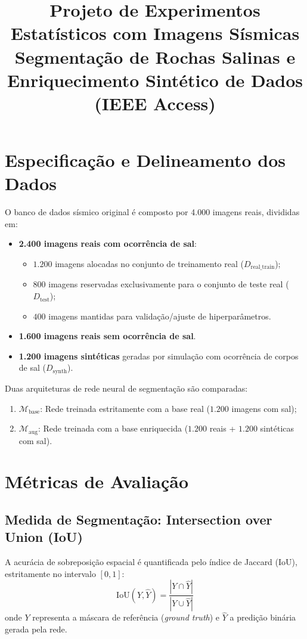 \documentclass[11pt,a4paper]{article}
\title{\textbf{Projeto de Experimentos Estatísticos com Imagens Sísmicas}\\
\large Segmentação de Rochas Salinas e Enriquecimento Sintético de Dados (IEEE Access)}
\begin{document}
\maketitle


\section{Especificação e Delineamento dos Dados}

O banco de dados sísmico original é composto por 4.000 imagens reais, divididas em:
\begin{itemize}
    \item \textbf{2.400 imagens reais com ocorrência de sal}:
    \begin{itemize}
        \item $1.200$ imagens alocadas no conjunto de treinamento real ($D_{\text{real\_train}}$);
        \item $800$ imagens reservadas exclusivamente para o conjunto de teste real ($D_{\text{test}}$);
        \item $400$ imagens mantidas para validação/ajuste de hiperparâmetros.
    \end{itemize}
    \item \textbf{1.600 imagens reais sem ocorrência de sal}.
    \item \textbf{1.200 imagens sintéticas} geradas por simulação com ocorrência de corpos de sal ($D_{\text{synth}}$).
\end{itemize}

Duas arquiteturas de rede neural de segmentação são comparadas:
\begin{enumerate}
    \item $\mathcal{M}_{\text{base}}$: Rede treinada estritamente com a base real ($1.200$ imagens com sal);
    \item $\mathcal{M}_{\text{aug}}$: Rede treinada com a base enriquecida ($1.200$ reais + $1.200$ sintéticas com sal).
\end{enumerate}

\section{Métricas de Avaliação}

\subsection{Medida de Segmentação: Intersection over Union (IoU)}
A acurácia de sobreposição espacial é quantificada pelo índice de Jaccard (IoU), estritamente no intervalo $[0, 1]$:
\begin{equation}
\text{IoU}(Y, \hat{Y}) = \frac{|Y \cap \hat{Y}|}{|Y \cup \hat{Y}|}
\end{equation}
onde $Y$ representa a máscara de referência (\textit{ground truth}) e $\hat{Y}$ a predição binária gerada pela rede. 
\end{document}
